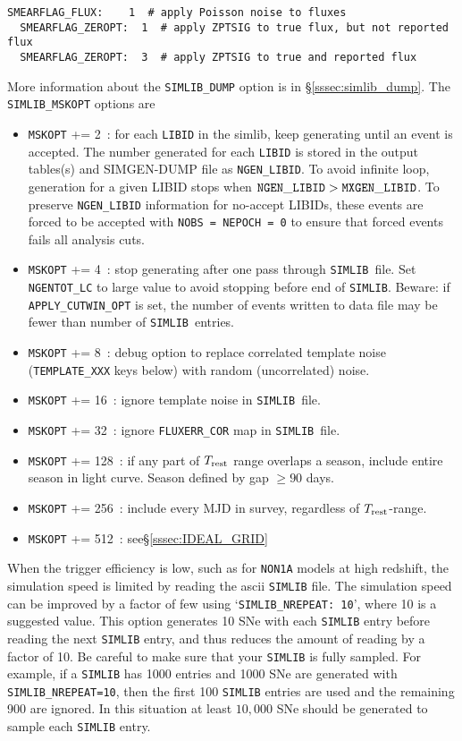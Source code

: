\documentclass[12pt]{article}
\newcommand{\Trest}{T_{\rm rest}}
\newcommand{\simlib}{{\tt SIMLIB}}
\begin{document}
{\begin{Verbatim}[frame=single]
  SMEARFLAG_FLUX:    1  # apply Poisson noise to fluxes
  SMEARFLAG_ZEROPT:  1  # apply ZPTSIG to true flux, but not reported flux
  SMEARFLAG_ZEROPT:  3  # apply ZPTSIG to true and reported flux
\end{Verbatim}

More information about the {\tt SIMLIB\_DUMP} option
is in \S\ref{sssec:simlib_dump}.
The {\tt SIMLIB\_MSKOPT} options are 
\begin{itemize}
   \item {\tt MSKOPT} += 2~: for each {\tt LIBID} in the simlib,
      keep generating until an event is accepted. 
      The number generated for each {\tt LIBID} is stored in
      the output tables(s) and SIMGEN-DUMP file as {\tt NGEN\_LIBID}.
      To avoid infinite loop, generation for a given LIBID stops 
      when  ${\tt NGEN\_LIBID} > {\tt MXGEN\_LIBID}$. 
      To preserve {\tt NGEN\_LIBID} information for no-accept LIBIDs,
      these events are forced to be accepted with 
      {\tt NOBS = NEPOCH = 0} 
      to ensure that forced events fails all analysis cuts.
%
   \item {\tt MSKOPT} += 4~: 
        stop generating after one pass through \simlib\ file.
        Set {\tt NGENTOT\_LC} to large value to avoid stopping
        before end of \simlib. Beware: if {\tt APPLY\_CUTWIN\_OPT} is set,
        the number of events written to data file may be fewer
        than number of \simlib\ entries.
%
   \item {\tt MSKOPT} += 8~: debug option to replace correlated
      template noise ({\tt TEMPLATE\_XXX} keys below) with
      random (uncorrelated) noise.
%
   \item {\tt MSKOPT} += 16~: ignore template noise in \simlib\ file.
%
   \item {\tt MSKOPT} += 32~: ignore {\tt FLUXERR\_COR} map in \simlib\ file.
%
   \item {\tt MSKOPT} += 128~: if any part of $\Trest$ range overlaps
      a season, include entire season in light curve. Season defined
      by gap $\ge 90$ days.
%
   \item {\tt MSKOPT} += 256~: include every MJD in survey, 
      regardless of $\Trest$-range.
%
   \item {\tt MSKOPT} += 512~:  see\S\ref{sssec:IDEAL_GRID}
\end{itemize}

\medskip
When the trigger efficiency is low, such as for {\tt NON1A} models
at high redshift, the simulation speed is limited by reading the
ascii {\tt SIMLIB} file. The simulation speed can be improved by
a factor of few using  `{\tt SIMLIB\_NREPEAT: 10}', where 10
is a suggested value.
This option generates 10 SNe with each {\tt SIMLIB} entry before
reading the next {\tt SIMLIB} entry, and thus reduces the amount
of reading by a factor of 10. Be careful to make sure that your
{\tt SIMLIB} is fully sampled. For example, if a {\tt SIMLIB} has
1000 entries and 1000 SNe are generated with {\tt SIMLIB\_NREPEAT=10},
then the first 100 {\tt SIMLIB} entries are  used
and the remaining 900 are ignored. In this situation at least
$10,000$ SNe should be generated to sample each {\tt SIMLIB} entry.

}
\end{document}
